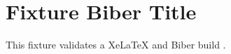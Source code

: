 \documentclass{article}
\begin{document}
\section*{Fixture Biber Title}
This fixture validates a XeLaTeX and Biber build \cite{fixture}.
\printbibliography
\end{document}
